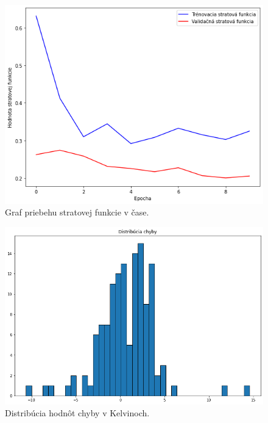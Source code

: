 \begin{figure}[!htbp]
  \centering
  \includegraphics[width=14cm]{img/loss.png}
  \caption{Graf priebehu stratovej funkcie v čase.}
  \label{lossfunction}
\end{figure}

\begin{figure}[!htbp]
  \centering
  \includegraphics[width=14cm]{img/distro_chyby.png}
  \caption{Distribúcia hodnôt chyby v Kelvinoch.}
  \label{dist_error}
\end{figure}

